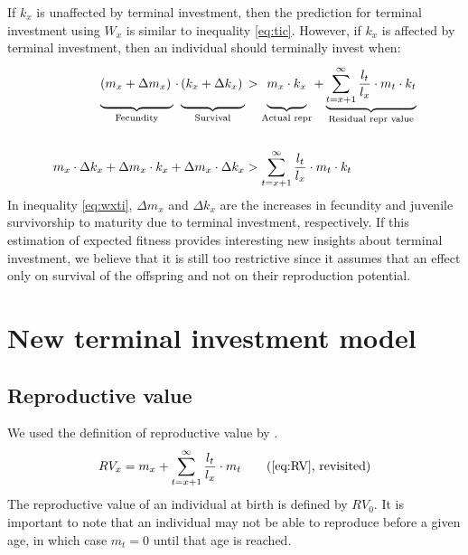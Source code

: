 \documentclass[12pt,review,authoryear]{elsarticle}
\begin{document}
If $k_x$ is unaffected by terminal investment, then the prediction for terminal investment using $W_{x}$ is similar to inequality \eqref{eq:tic}. However, if $k_x$ is affected by terminal investment, then an individual should terminally invest when:
\begin{equation}\label{eq:wxti}
\begin{split}
\def\tallest{\vphantom{\sum_{1}^{1} \frac{1}{1}}}
\underbrace{\left(m_{x} + \Delta m_{x}\right)\tallest}_{\text{Fecundity}} \cdot 
\underbrace{\left(k_{x} + \Delta k_{x}\right)\tallest}_{\text{Survival}} &> 
\def\tallest{\vphantom{\sum_{1}^{1} \frac{1}{1}}}
\underbrace{ m_{x} \cdot k_{x}\tallest }_{\text{Actual repr}} + 
\underbrace{ \sum_{t= x + 1}^{\infty} \frac{l_t}{l_x} \cdot m_t \cdot k_t}_{\text{Residual repr value}}
 \\ \\ 
m_x \cdot \Delta k_{x} + \Delta m_{x} \cdot k_x + \Delta m_{x} \cdot \Delta k_{x} &> \sum_{t= x + 1}^{\infty} \frac{l_t}{l_x} \cdot m_t \cdot k_t
\end{split}
\end{equation}
In inequality \ref{eq:wxti}, $\Delta m_{x}$ and $\Delta k_{x}$ are the increases in fecundity and juvenile survivorship to maturity due to terminal investment, respectively. If this estimation of expected fitness provides interesting new insights about terminal investment, we believe that it is still too restrictive since it assumes that an effect only on survival of the offspring and not on their reproduction potential.



\section{New terminal investment model}
\subsection{Reproductive value}
We used the definition of reproductive value by \cite{Williams_Natural_1966}.
\begin{equation*}\label{eq:RVrev}
	RV_x = m_x + \sum_{t= x + 1}^{\infty} \frac{l_t}{l_x} \cdot m_t \tag{\ref{eq:RV}, revisited}
\end{equation*}
The reproductive value of an individual at birth is defined by $RV_{0}$. It is important to note that an individual may not be able to reproduce before a given age, in which case $m_{t}=0$ until that age is reached.
\end{document}
